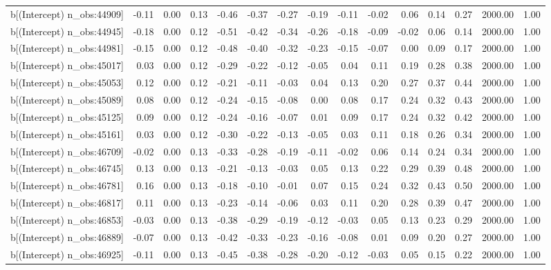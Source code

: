 \begin{table}[ht]
\begin{tabular}{rrrrrrrrrrrrrrr}
  b[(Intercept) n\_obs:44909] & -0.11 & 0.00 & 0.13 & -0.46 & -0.37 & -0.27 & -0.19 & -0.11 & -0.02 & 0.06 & 0.14 & 0.27 & 2000.00 & 1.00 \\ 
  b[(Intercept) n\_obs:44945] & -0.18 & 0.00 & 0.12 & -0.51 & -0.42 & -0.34 & -0.26 & -0.18 & -0.09 & -0.02 & 0.06 & 0.14 & 2000.00 & 1.00 \\ 
  b[(Intercept) n\_obs:44981] & -0.15 & 0.00 & 0.12 & -0.48 & -0.40 & -0.32 & -0.23 & -0.15 & -0.07 & 0.00 & 0.09 & 0.17 & 2000.00 & 1.00 \\ 
  b[(Intercept) n\_obs:45017] & 0.03 & 0.00 & 0.12 & -0.29 & -0.22 & -0.12 & -0.05 & 0.04 & 0.11 & 0.19 & 0.28 & 0.38 & 2000.00 & 1.00 \\ 
  b[(Intercept) n\_obs:45053] & 0.12 & 0.00 & 0.12 & -0.21 & -0.11 & -0.03 & 0.04 & 0.13 & 0.20 & 0.27 & 0.37 & 0.44 & 2000.00 & 1.00 \\ 
  b[(Intercept) n\_obs:45089] & 0.08 & 0.00 & 0.12 & -0.24 & -0.15 & -0.08 & 0.00 & 0.08 & 0.17 & 0.24 & 0.32 & 0.43 & 2000.00 & 1.00 \\ 
  b[(Intercept) n\_obs:45125] & 0.09 & 0.00 & 0.12 & -0.24 & -0.16 & -0.07 & 0.01 & 0.09 & 0.17 & 0.24 & 0.32 & 0.42 & 2000.00 & 1.00 \\ 
  b[(Intercept) n\_obs:45161] & 0.03 & 0.00 & 0.12 & -0.30 & -0.22 & -0.13 & -0.05 & 0.03 & 0.11 & 0.18 & 0.26 & 0.34 & 2000.00 & 1.00 \\ 
  b[(Intercept) n\_obs:46709] & -0.02 & 0.00 & 0.13 & -0.33 & -0.28 & -0.19 & -0.11 & -0.02 & 0.06 & 0.14 & 0.24 & 0.34 & 2000.00 & 1.00 \\ 
  b[(Intercept) n\_obs:46745] & 0.13 & 0.00 & 0.13 & -0.21 & -0.13 & -0.03 & 0.05 & 0.13 & 0.22 & 0.29 & 0.39 & 0.48 & 2000.00 & 1.00 \\ 
  b[(Intercept) n\_obs:46781] & 0.16 & 0.00 & 0.13 & -0.18 & -0.10 & -0.01 & 0.07 & 0.15 & 0.24 & 0.32 & 0.43 & 0.50 & 2000.00 & 1.00 \\ 
  b[(Intercept) n\_obs:46817] & 0.11 & 0.00 & 0.13 & -0.23 & -0.14 & -0.06 & 0.03 & 0.11 & 0.20 & 0.28 & 0.39 & 0.47 & 2000.00 & 1.00 \\ 
  b[(Intercept) n\_obs:46853] & -0.03 & 0.00 & 0.13 & -0.38 & -0.29 & -0.19 & -0.12 & -0.03 & 0.05 & 0.13 & 0.23 & 0.29 & 2000.00 & 1.00 \\ 
  b[(Intercept) n\_obs:46889] & -0.07 & 0.00 & 0.13 & -0.42 & -0.33 & -0.23 & -0.16 & -0.08 & 0.01 & 0.09 & 0.20 & 0.27 & 2000.00 & 1.00 \\ 
  b[(Intercept) n\_obs:46925] & -0.11 & 0.00 & 0.13 & -0.45 & -0.38 & -0.28 & -0.20 & -0.12 & -0.03 & 0.05 & 0.15 & 0.22 & 2000.00 & 1.00 \\ 

\end{tabular}
\end{table}
